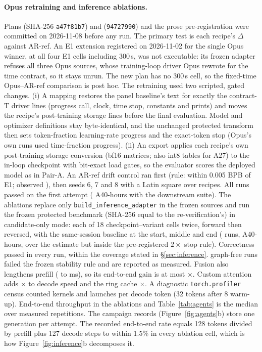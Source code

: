 \documentclass{article}
\begin{document}
\paragraph{Opus retraining and inference ablations.} Plans  (SHA-256 \texttt{a47f81b7}) and  (\texttt{94727990}) and the prose pre-registration  were committed on 2026-11-08 before any run. The primary test is each recipe's $\Delta$ against AR-ref. An E1 extension registered on 2026-11-02 for the single Opus winner, at all four E1 cells including 300\,s, was not executable: its frozen adapter refuses all three Opus sources, whose training-loop driver Opus rewrote for the time contract, so it stays unrun. The new plan has no 300\,s cell, so the fixed-time Opus--AR-ref comparison is post hoc. The retraining used two scripted, gated changes. (i) A mapping restores the panel baseline's text for exactly the contract-T driver lines (progress call, clock, time stop, constants and prints) and moves the recipe's post-training storage lines before the final evaluation. Model and optimizer definitions stay byte-identical, and the unchanged protected transform then sets token-fraction learning-rate progress and the exact-token stop (Opus's own runs used time-fraction progress). (ii) An export applies each recipe's own post-training storage conversion (bf16 matrices; also int8 tables for A27) to the in-loop checkpoint with bit-exact load gates, so the evaluator scores the deployed model as in Pair-A. An AR-ref drift control ran first (rule: within 0.005 BPB of E1; observed \CRMTDriftAbs), then seeds 6, 7 and 8 with a Latin square over recipes. All \CRMTRuns{} runs passed on the first attempt (\CRMTHours{} A40-hours with the downstream suite). The ablations replace only \texttt{build\_inference\_adapter} in the frozen sources and run the frozen protected benchmark (SHA-256 equal to the re-verification's) in candidate-only mode: each of 18 checkpoint--variant cells twice, forward then reversed, with the same-session baseline at the start, middle and end (\CRIARuns{} runs, \CRIAHours{} A40-hours, over the estimate but inside the pre-registered $2\times$ stop rule). Correctness passed in every run, within the coverage stated in \S\ref{sec:inference}. \CRIAUnstable{} graph-free runs failed the frozen stability rule and are reported as measured. Fusion also lengthens prefill (\CRThreePreNoFusion{} to \CRThreePreOpus{} ms), so its end-to-end gain is at most \CRIAFusionEtoEHi$\times$. Custom attention adds \CRIAAttnLo$\times$ to decode speed and the ring cache \CRIARingLo$\times$. A diagnostic \texttt{torch.profiler} census counted kernels and launches per decode token (32 tokens after 8 warm-up). End-to-end throughput in the ablations and Table~\ref{tab:agents} is the median over measured repetitions. The campaign records (Figure~\ref{fig:agents}b) store one generation per attempt. The recorded end-to-end rate equals 128 tokens divided by prefill plus 127 decode steps to within 1.5\% in every ablation cell, which is how Figure~\ref{fig:inference}b decomposes it.
\end{document}
